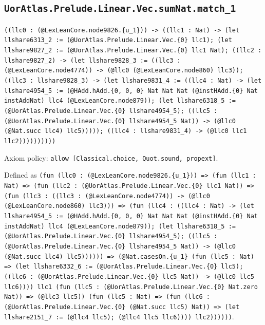 \documentclass[11pt]{article}
\begin{document}
\subsection*{\texttt{UorAtlas.Prelude.Linear.Vec.sumNat.match\_1}}
\noindent\texttt{((llc0 : (@LexLeanCore.node9826.\{u\_1\})) -> ((llc1 : Nat) -> (let llshare6313\_2 := (@UorAtlas.Prelude.Linear.Vec.\{0\} llc1); (let llshare9827\_2 := (@UorAtlas.Prelude.Linear.Vec.\{0\} llc1 Nat); ((llc2 : llshare9827\_2) -> (let llshare9828\_3 := ((llc3 : (@LexLeanCore.node4774)) -> (@llc0 (@LexLeanCore.node860) llc3)); ((llc3 : llshare9828\_3) -> (let llshare9831\_4 := ((llc4 : Nat) -> (let llshare4954\_5 := (@HAdd.hAdd.\{0, 0, 0\} Nat Nat Nat (@instHAdd.\{0\} Nat instAddNat) llc4 (@LexLeanCore.node879)); (let llshare6318\_5 := (@UorAtlas.Prelude.Linear.Vec.\{0\} llshare4954\_5); ((llc5 : (@UorAtlas.Prelude.Linear.Vec.\{0\} llshare4954\_5 Nat)) -> (@llc0 (@Nat.succ llc4) llc5))))); ((llc4 : llshare9831\_4) -> (@llc0 llc1 llc2))))))))))}\par
\noindent Axiom policy: \texttt{allow [Classical.choice, Quot.sound, propext]}.\par
\noindent Defined as \texttt{(fun (llc0 : (@LexLeanCore.node9826.\{u\_1\})) => (fun (llc1 : Nat) => (fun (llc2 : (@UorAtlas.Prelude.Linear.Vec.\{0\} llc1 Nat)) => (fun (llc3 : ((llc3 : (@LexLeanCore.node4774)) -> (@llc0 (@LexLeanCore.node860) llc3))) => (fun (llc4 : ((llc4 : Nat) -> (let llshare4954\_5 := (@HAdd.hAdd.\{0, 0, 0\} Nat Nat Nat (@instHAdd.\{0\} Nat instAddNat) llc4 (@LexLeanCore.node879)); (let llshare6318\_5 := (@UorAtlas.Prelude.Linear.Vec.\{0\} llshare4954\_5); ((llc5 : (@UorAtlas.Prelude.Linear.Vec.\{0\} llshare4954\_5 Nat)) -> (@llc0 (@Nat.succ llc4) llc5)))))) => (@Nat.casesOn.\{u\_1\} (fun (llc5 : Nat) => (let llshare6332\_6 := (@UorAtlas.Prelude.Linear.Vec.\{0\} llc5); ((llc6 : (@UorAtlas.Prelude.Linear.Vec.\{0\} llc5 Nat)) -> (@llc0 llc5 llc6)))) llc1 (fun (llc5 : (@UorAtlas.Prelude.Linear.Vec.\{0\} Nat.zero Nat)) => (@llc3 llc5)) (fun (llc5 : Nat) => (fun (llc6 : (@UorAtlas.Prelude.Linear.Vec.\{0\} (@Nat.succ llc5) Nat)) => (let llshare2151\_7 := (@llc4 llc5); (@llc4 llc5 llc6)))) llc2))))))}.\par
\end{document}
